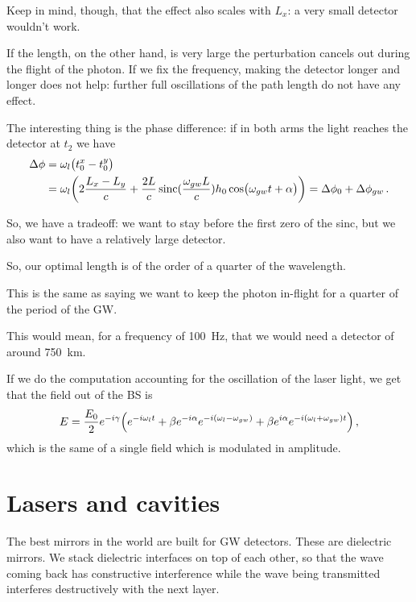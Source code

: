 \documentclass[main.tex]{subfiles}
\begin{document}
Keep in mind, though, that the effect also scales with \(L_x\): a very small detector wouldn't work. 

If the length, on the other hand, is very large the perturbation cancels out during the flight of the photon.  
If we fix the frequency, making the detector longer and longer does not help: further full oscillations of the path length do not have any effect.

The interesting thing is the phase difference: if in both arms the light reaches the detector at \(t_2 \) we have 
%
\begin{align}
\Delta \phi 
&= \omega_{l} \qty(t_0^{x }- t_0^{y}) \\
&= \omega_{l} \qty(2 \frac{L_x -L_y}{c} + \frac{2L}{c} \operatorname{sinc}(\frac{\omega_{gw} L}{c} ) h_0 \cos(\omega_{gw} t + \alpha )) = \Delta \phi_0 + \Delta \phi_{gw}
\,.
\end{align}

So, we have a tradeoff: we want to stay before the first zero of the sinc, but we also want to have a relatively large detector.

So, our optimal length is of the order of a quarter of the wavelength.

This is the same as saying we want to keep the photon in-flight for a quarter of the period of the GW. 

This would mean, for a frequency of \SI{100}{Hz}, that we would need a detector of around \SI{750}{km}.

If we do the computation accounting for the oscillation of the laser light, we get that the field out of the BS is 
%
\begin{align}
E = \frac{E_0}{2} e^{-i \gamma } \qty(e^{-i \omega_{l} t}
+ \beta e^{-i \alpha } e^{-i (\omega_{l} - \omega_{gw})} + \beta e^{i \alpha } e^{-i (\omega_{l} + \omega_{gw}) t})
\,,
\end{align}
%
which is the same of a single field which is modulated in amplitude.

\section{Lasers and cavities}

The best mirrors in the world are built for GW detectors.
These are dielectric mirrors.
We stack dielectric interfaces on top of each other, so that the wave coming back has constructive interference while the wave being transmitted interferes destructively with the next layer.
\end{document}
